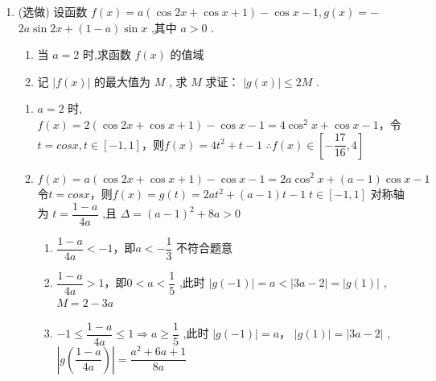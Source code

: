 \begin{enumerate}
\begin{jieda}
        再根据 $ 0 < \sin \dfrac{\pi }{12} < \dfrac{1}{2} $ 知 $ 0 < \dfrac{1}{4\sin \dfrac{\pi }{12}} < \dfrac{1}{2} $ ,且 $ cos\dfrac{\pi }{12} = cos\left(\dfrac{25}{12}\pi\right)  > \dfrac{1}{2} $ , 故有 2 个
    \end{jieda}
    \item (选做) 设函数 $ f\left( x\right)  = a\left( {\cos {2x} + \cos x + 1}\right)  - \cos x - 1,g\left( x\right)  =  - $
    $ {2a}\sin {2x} + \left( {1 - a}\right) \sin x $ ,其中 $ a > 0 $ .
    \begin{enumerate}
        \item 当 $ a = 2 $ 时,求函数 $ f\left( x\right) $ 的值域
        \item 记 $ |f\left( x\right)| $ 的最大值为 $ M $ , 求 $ M $ 求证：
        $ \left| g(x)\right| \leq  {2M} $ .
    \end{enumerate}
    \begin{jieda}
        \begin{enumerate}
        \item $ a = 2 $ 时, $ f\left( x\right)  = 2\left( {\cos {2x} + \cos x + 1}\right)  - \cos x - 1 = 4{\cos }^{2}x + \cos x - 1$，令$t = cosx, t \in  \left\lbrack  {-1,1}\right\rbrack$，则$f(x) = 4{t}^{2} + t - 1$
        $ \therefore f\left( x\right)  \in  \left\lbrack  {-\dfrac{17}{16},4}\right\rbrack $
        \item 
         $ f\left( x\right)  = a\left( {\cos {2x} + \cos x + 1}\right)  - \cos x - 1 = {2a}{\cos }^{2}x + \left( {a - 1}\right) \cos x - 1 $\\
        令$t = cosx$，则$f(x) = g(t) = {2a}{t}^{2} + \left( {a - 1}\right) t - 1\;t \in  \left\lbrack  {-1,1}\right\rbrack $
        对称轴为 $ t = \dfrac{1 - a}{4a} $ ,且 $ \Delta  = {\left( a - 1\right) }^{2} + {8a} > 0 $
        \begin{enumerate}
            \item $ \dfrac{1 - a}{4a} <  - 1 $，即$ a <  - \dfrac{1}{3} $ 不符合题意
            \item $ \dfrac{1 - a}{4a} > 1 $，即$ 0 < a < \dfrac{1}{5} $ ,此时 $ \left| {g\left(-1\right) }\right|  = a < \left| {{3a} - 2}\right|  = \left| {g\left( 1\right) }\right| $ , $ M = 2 - {3a} $
            \item 
            $ - 1 \leq  \dfrac{1 - a}{4a} \leq  1 \Rightarrow  a \geq  \dfrac{1}{5} $ ,此时 $ \left| {g\left( {-1}\right) }\right|  = a $， $ \left| {g\left( 1\right) }\right|  = \left| {{3a} - 2}\right| $ , $ \left| {g\left( \dfrac{1 - a}{4a}\right) }\right|  = \dfrac{{a}^{2} + {6a} + 1}{8a} $ \\

\end{enumerate}
\end{enumerate}
\end{jieda}
\end{enumerate}
